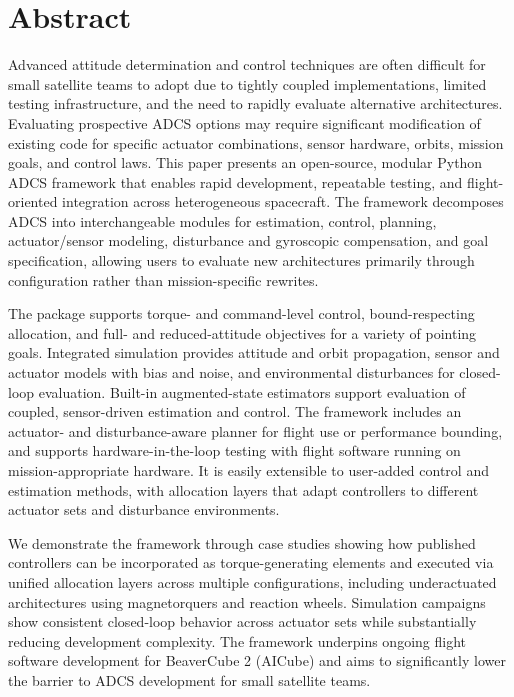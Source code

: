 \documentclass[conference]{IEEEtran}
\begin{document}
\section{Abstract}

Advanced attitude determination and control techniques are often difficult for small satellite teams to adopt due to tightly coupled implementations, limited testing infrastructure, and the need to rapidly evaluate alternative architectures. Evaluating prospective ADCS options may require significant modification of existing code for specific actuator combinations, sensor hardware, orbits, mission goals, and control laws. This paper presents an open-source, modular Python ADCS framework that enables rapid development, repeatable testing, and flight-oriented integration across heterogeneous spacecraft. The framework decomposes ADCS into interchangeable modules for estimation, control, planning, actuator/sensor modeling, disturbance and gyroscopic compensation, and goal specification, allowing users to evaluate new architectures primarily through configuration rather than mission-specific rewrites.

The package supports torque- and command-level control, bound-respecting allocation, and full- and reduced-attitude objectives for a variety of pointing goals. Integrated simulation provides attitude and orbit propagation, sensor and actuator models with bias and noise, and environmental disturbances for closed-loop evaluation. Built-in augmented-state estimators support evaluation of coupled, sensor-driven estimation and control. The framework includes an actuator- and disturbance-aware planner for flight use or performance bounding, and supports hardware-in-the-loop testing with flight software running on mission-appropriate hardware. It is easily extensible to user-added control and estimation methods, with allocation layers that adapt controllers to different actuator sets and disturbance environments.

We demonstrate the framework through case studies showing how published controllers can be incorporated as torque-generating elements and executed via unified allocation layers across multiple configurations, including underactuated architectures using magnetorquers and reaction wheels. Simulation campaigns show consistent closed-loop behavior across actuator sets while substantially reducing development complexity. The framework underpins ongoing flight software development for BeaverCube 2 (AICube) and aims to significantly lower the barrier to ADCS development for small satellite teams.
\end{document}
